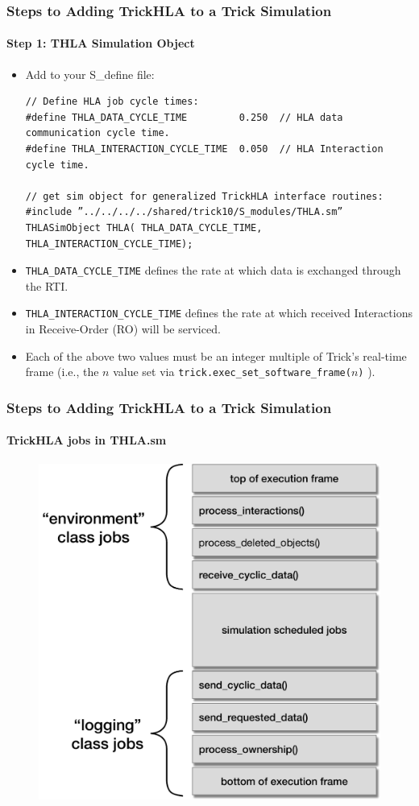 \documentclass{beamer}
\begin{document}
   \begin{frame}[fragile]
      \frametitle{Steps to Adding TrickHLA to a Trick Simulation}
      \framesubtitle{Step 1: THLA Simulation Object}
      \begin{itemize}
         \item Add to your S\_define file:
\begin{Verbatim}[frame=single, fontsize=\tiny]
// Define HLA job cycle times:
#define THLA_DATA_CYCLE_TIME         0.250  // HLA data communication cycle time.
#define THLA_INTERACTION_CYCLE_TIME  0.050  // HLA Interaction cycle time.

// get sim object for generalized TrickHLA interface routines:
#include ”../../../../shared/trick10/S_modules/THLA.sm”
THLASimObject THLA( THLA_DATA_CYCLE_TIME, THLA_INTERACTION_CYCLE_TIME);
\end{Verbatim}
         \item \texttt{THLA\_DATA\_CYCLE\_TIME} defines the rate at which data is
         exchanged through the RTI.
         \item \texttt{THLA\_INTERACTION\_CYCLE\_TIME} defines the rate at which
         received Interactions in Receive-Order (RO) will be serviced.
         \item Each of the above two values must be an integer multiple of Trick’s
         real-time frame (i.e., the $n$ value set via
         \texttt{trick.exec\_set\_software\_frame($n$)} ). 
      \end{itemize}
   \end{frame}
   
   \begin{frame}
      \frametitle{Steps to Adding TrickHLA to a Trick Simulation}
      \framesubtitle{TrickHLA jobs in THLA.sm}
      \begin{figure}
      \includegraphics[scale=0.4]{TutorialTHLAJobs.pdf}
      \end{figure}
   \end{frame}
   
\end{document}
